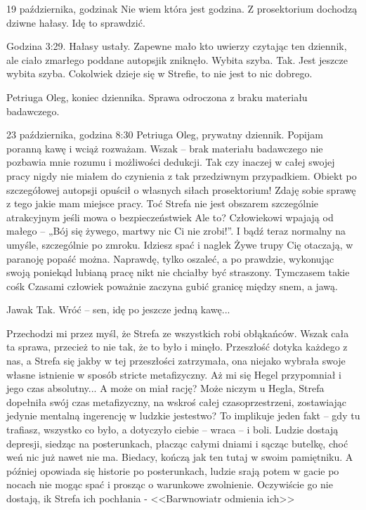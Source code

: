 \documentclass[../MAIN.tex]{subfiles}
\begin{document}
19 października, godzina\3k Nie wiem która jest godzina. Z
prosektorium dochodzą dziwne hałasy. Idę to sprawdzić.

Godzina 3:29. Hałasy ustały. Zapewne mało kto uwierzy czytając
ten dziennik, ale ciało zmarłego poddane autopsji\3k zniknęło.
Wybita szyba. Tak. Jest jeszcze wybita szyba. Cokolwiek dzieje
się w Strefie, to nie jest to nic dobrego.

Petriuga Oleg, koniec dziennika. Sprawa odroczona z braku
materiału badawczego.

23 października, godzina 8:30
Petriuga Oleg, prywatny dziennik. Popijam poranną kawę i wciąż
rozważam. Wszak – brak materiału badawczego nie pozbawia mnie
rozumu i możliwości dedukcji. Tak czy inaczej w całej swojej
pracy nigdy nie miałem do czynienia z tak przedziwnym
przypadkiem. Obiekt po szczegółowej autopsji opuścił o własnych
siłach prosektorium! Zdaję sobie sprawę z tego jakie mam
miejsce pracy. Toć Strefa nie jest obszarem szczególnie
atrakcyjnym jeśli mowa o bezpieczeństwie\3k Ale to?
Człowiekowi wpajają od małego – „Bój się żywego, martwy nic Ci
nie zrobi!”. I bądź teraz normalny na umyśle, szczególnie po
zmroku. Idziesz spać i nagle\3k Żywe trupy Cię otaczają, w
paranoję popaść można. Naprawdę, tylko oszaleć, a po prawdzie,
wykonując swoją poniekąd lubianą pracę nikt nie chciałby być
straszony. Tymczasem takie coś\3k Czasami człowiek poważnie
zaczyna gubić granicę między snem, a jawą.

Jawa\3k Tak. Wróć – sen, idę po jeszcze jedną kawę...

Przechodzi mi przez myśl, że Strefa ze wszystkich robi
obłąkańców. Wszak cała ta sprawa, przecież to nie tak, że to
było i minęło. Przeszłość dotyka każdego z nas, a Strefa się
jakby w tej przeszłości zatrzymała, ona niejako wybrała swoje
własne istnienie w sposób stricte metafizyczny. Aż mi się Hegel
przypomniał i jego czas absolutny... A może on miał rację?
Może niczym u Hegla, Strefa dopełniła swój czas metafizyczny,
na wskroś całej czasoprzestrzeni, zostawiając jedynie mentalną
ingerencję w ludzkie jestestwo? To implikuje jeden fakt – gdy
tu trafiasz, wszystko co było, a dotyczyło ciebie – wraca – i
boli. Ludzie dostają depresji, siedząc na posterunkach, płacząc
całymi dniami i sącząc butelkę, choć weń nic już nawet nie ma.
Biedacy, kończą jak ten tutaj w swoim pamiętniku. A później
opowiada się historie po posterunkach, ludzie srają potem w
gacie po nocach nie mogąc spać i prosząc o warunkowe
zwolnienie. Oczywiście go nie dostają, i\3k Strefa ich
pochłania - <<Barwnowiatr odmienia ich>>
\end{document}
